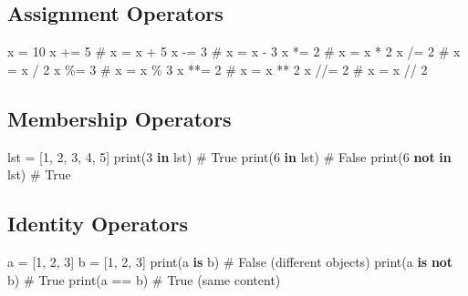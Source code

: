 \documentclass[
  letterpaper,
  DIV=11,
  numbers=noendperiod]{scrreprt}
\newenvironment{Shaded}{\begin{snugshade}}{\end{snugshade}}
\newcommand{\BuiltInTok}[1]{\textcolor[rgb]{0.00,0.23,0.31}{#1}}
\newcommand{\CommentTok}[1]{\textcolor[rgb]{0.37,0.37,0.37}{#1}}
\newcommand{\DecValTok}[1]{\textcolor[rgb]{0.68,0.00,0.00}{#1}}
\newcommand{\KeywordTok}[1]{\textcolor[rgb]{0.00,0.23,0.31}{\textbf{#1}}}
\newcommand{\NormalTok}[1]{\textcolor[rgb]{0.00,0.23,0.31}{#1}}
\newcommand{\OperatorTok}[1]{\textcolor[rgb]{0.37,0.37,0.37}{#1}}
\begin{document}
\subsection{Assignment Operators}\label{assignment-operators}

\begin{Shaded}
\begin{Highlighting}[]
\NormalTok{x }\OperatorTok{=} \DecValTok{10}
\NormalTok{x }\OperatorTok{+=} \DecValTok{5}  \CommentTok{\# x = x + 5}
\NormalTok{x }\OperatorTok{{-}=} \DecValTok{3}  \CommentTok{\# x = x {-} 3}
\NormalTok{x }\OperatorTok{*=} \DecValTok{2}  \CommentTok{\# x = x * 2}
\NormalTok{x }\OperatorTok{/=} \DecValTok{2}  \CommentTok{\# x = x / 2}
\NormalTok{x }\OperatorTok{\%=} \DecValTok{3}  \CommentTok{\# x = x \% 3}
\NormalTok{x }\OperatorTok{**=} \DecValTok{2} \CommentTok{\# x = x ** 2}
\NormalTok{x }\OperatorTok{//=} \DecValTok{2} \CommentTok{\# x = x // 2}
\end{Highlighting}
\end{Shaded}

\subsection{Membership Operators}\label{membership-operators}

\begin{Shaded}
\begin{Highlighting}[]
\NormalTok{lst }\OperatorTok{=}\NormalTok{ [}\DecValTok{1}\NormalTok{, }\DecValTok{2}\NormalTok{, }\DecValTok{3}\NormalTok{, }\DecValTok{4}\NormalTok{, }\DecValTok{5}\NormalTok{]}
\BuiltInTok{print}\NormalTok{(}\DecValTok{3} \KeywordTok{in}\NormalTok{ lst)  }\CommentTok{\# True}
\BuiltInTok{print}\NormalTok{(}\DecValTok{6} \KeywordTok{in}\NormalTok{ lst)  }\CommentTok{\# False}
\BuiltInTok{print}\NormalTok{(}\DecValTok{6} \KeywordTok{not} \KeywordTok{in}\NormalTok{ lst)  }\CommentTok{\# True}
\end{Highlighting}
\end{Shaded}

\subsection{Identity Operators}\label{identity-operators}

\begin{Shaded}
\begin{Highlighting}[]
\NormalTok{a }\OperatorTok{=}\NormalTok{ [}\DecValTok{1}\NormalTok{, }\DecValTok{2}\NormalTok{, }\DecValTok{3}\NormalTok{]}
\NormalTok{b }\OperatorTok{=}\NormalTok{ [}\DecValTok{1}\NormalTok{, }\DecValTok{2}\NormalTok{, }\DecValTok{3}\NormalTok{]}
\BuiltInTok{print}\NormalTok{(a }\KeywordTok{is}\NormalTok{ b)      }\CommentTok{\# False (different objects)}
\BuiltInTok{print}\NormalTok{(a }\KeywordTok{is} \KeywordTok{not}\NormalTok{ b)  }\CommentTok{\# True}
\BuiltInTok{print}\NormalTok{(a }\OperatorTok{==}\NormalTok{ b)      }\CommentTok{\# True (same content)}
\end{Highlighting}
\end{Shaded}
\end{document}
